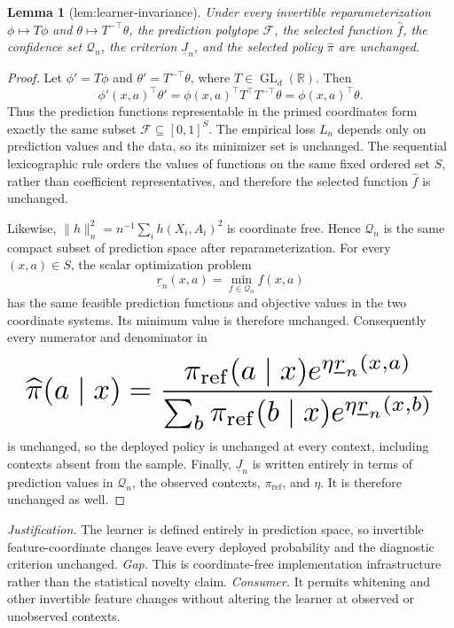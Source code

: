 \documentclass{article}
\newtheorem{lemma}{Lemma}
\begin{document}
\begin{lemma}[lem:learner-invariance]\label{lem:learner-invariance}
Under every invertible reparameterization \(\phi\mapsto T\phi\) and \(\theta\mapsto T^{-\top}\theta\), the prediction polytope \(\mathcal F\), the selected function \(\widehat f\), the confidence set \(\mathcal Q_n\), the criterion \(\underline J_n\), and the selected policy \(\widehat\pi\) are unchanged.
\end{lemma}
\begin{proof}
Let \(\phi'=T\phi\) and \(\theta'=T^{-\top}\theta\), where \(T\in\operatorname{GL}_d(\mathbb R)\). Then
\[
\phi'(x,a)^\top\theta'=\phi(x,a)^\top T^\top T^{-\top}\theta=\phi(x,a)^\top\theta.
\]
Thus the prediction functions representable in the primed coordinates form exactly the same subset \(\mathcal F\subseteq[0,1]^S\). The empirical loss \(L_n\) depends only on prediction values and the data, so its minimizer set is unchanged. The sequential lexicographic rule orders the values of functions on the same fixed ordered set \(S\), rather than coefficient representatives, and therefore the selected function \(\widehat f\) is unchanged.

Likewise, \(\|h\|_n^2=n^{-1}\sum_i h(X_i,A_i)^2\) is coordinate free. Hence \(\mathcal Q_n\) is the same compact subset of prediction space after reparameterization. For every \((x,a)\in S\), the scalar optimization problem
\[
\underline r_n(x,a)=\min_{f\in\mathcal Q_n}f(x,a)
\]
has the same feasible prediction functions and objective values in the two coordinate systems. Its minimum value is therefore unchanged. Consequently every numerator and denominator in
\[
\makebox[\linewidth][c]{\resizebox{0.98\linewidth}{!}{\par\noindent \makebox[\linewidth][c]{\resizebox{0.98\linewidth}{!}{\(\displaystyle \displaystyle \widehat\pi(a\mid x)=\frac{\pi_{\mathrm{ref}}(a\mid x)e^{\eta\underline r_n(x,a)}}{\sum_b\pi_{\mathrm{ref}}(b\mid x)e^{\eta\underline r_n(x,b)}}\)}}\par\noindent}}
\]
is unchanged, so the deployed policy is unchanged at every context, including contexts absent from the sample. Finally, \(\underline J_n\) is written entirely in terms of prediction values in \(\mathcal Q_n\), the observed contexts, \(\pi_{\mathrm{ref}}\), and \(\eta\). It is therefore unchanged as well.
\end{proof}
\par\smallskip\noindent \textit{Justification.} The learner is defined entirely in prediction space, so invertible feature-coordinate changes leave every deployed probability and the diagnostic criterion unchanged. \textit{Gap.} This is coordinate-free implementation infrastructure rather than the statistical novelty claim. \textit{Consumer.} It permits whitening and other invertible feature changes without altering the learner at observed or unobserved contexts.
\end{document}
